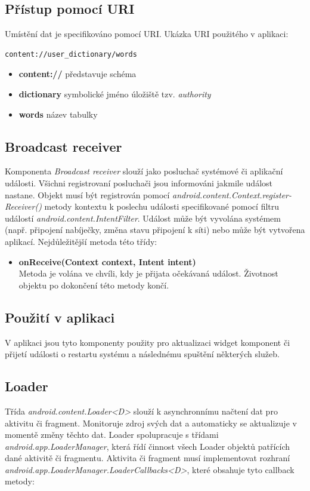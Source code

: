 \documentclass{diplomka}
\begin{document}
\subsection*{Přístup pomocí URI}
Umístění dat je specifikováno pomocí URI. Ukázka URI použitého v aplikaci:
\begin{verbatim}
content://user_dictionary/words
\end{verbatim}
\begin{itemize}[noitemsep,nolistsep]
\item \textbf{content://} představuje schéma
\item \textbf{dictionary} symbolické jméno úložiště tzv. \emph{authority}
\item \textbf{words} název tabulky
\end{itemize}

\subsection{Broadcast receiver}
\label{sec:broadcast}
Komponenta \emph{Broadcast receiver} slouží jako posluchač systémové či aplikační události. Všichni registrovaní posluchači jsou informováni jakmile událost nastane. Objekt musí být registrován pomocí \emph{android.content.Context.register-Receiver()} metody kontextu k poslechu události specifikované pomocí filtru událostí \emph{android.content.IntentFilter}. Událost může být vyvolána systémem (např. připojení nabíječky, změna stavu připojení k síti) nebo může být vytvořena aplikací. Nejdůležitější metoda této třídy:
\begin{itemize}[]
\item \textbf{onReceive(Context context, Intent intent)}\\
Metoda je volána ve chvíli, kdy je přijata očekávaná událost. Životnost objektu po dokončení této metody končí.
\end{itemize}
\subsection*{Použití v aplikaci}
V aplikaci jsou tyto komponenty použity pro aktualizaci widget komponent či přijetí události o restartu systému a následnému spuštění některých služeb.

\subsection{Loader}
Třída \emph{android.content.Loader<D>} slouží k asynchronnímu načtení dat pro aktivitu či fragment. Monitoruje zdroj svých dat a automaticky se aktualizuje v momentě změny těchto dat. Loader spolupracuje s třídami \emph{	android.app.LoaderManager}, která řídí činnost všech Loader objektů patřících dané aktivitě či fragmentu. Aktivita či fragment musí implementovat rozhraní \emph{android.app.LoaderManager.LoaderCallbacks<D>}, které obsahuje tyto callback metody:
\end{document}

